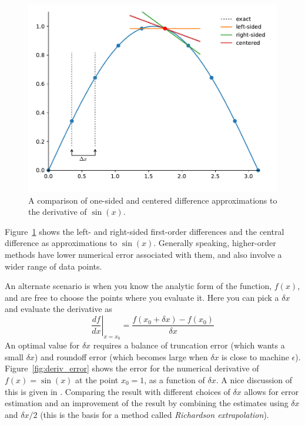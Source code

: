 \begin{figure}[t]
\centering
\includegraphics[width=0.8\linewidth]{derivs}
\caption[Difference approximations to the derivative of $\sin(x)$]
        {\label{fig:derivs} A comparison of one-sided and centered
          difference approximations to the derivative of $\sin(x)$.}
\end{figure}

Figure~\ref{fig:derivs} shows the left- and right-sided first-order
differences and the central difference as approximations to
$\sin(x)$. Generally speaking, higher-order methods have lower
numerical error associated with them, and also involve a wider range
of data points.

An alternate scenario is when you know the analytic form of the
function, $f(x)$, and are free to choose the points where you evaluate
it.  Here you can pick a $\delta x$ and evaluate the derivative as
\begin{equation}
\left . \frac{df}{dx} \right |_{x=x_0} =  \frac{f(x_0+\delta x) - f(x_0)}{\delta x}
\end{equation}
An optimal value for $\delta x$ requires a balance of truncation error
(which wants a small $\delta x$)  and roundoff error (which becomes large
when $\delta x$ is close to machine $\epsilon$).  Figure~\ref{fig:deriv_error}
shows the error for the numerical derivative of $f(x) = \sin(x)$ at the
point $x_0 = 1$, as a function of $\delta x$.  A nice discussion of
this is given in \cite{yak}.  Comparing the result with different choices
of $\delta x$ allows for error estimation and an improvement of the result
by combining the estimates using $\delta x$ and $\delta x/2$ (this is the
basis for a method called {\em Richardson extrapolation}).

